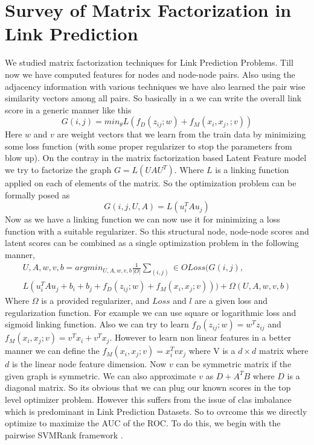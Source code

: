 \section*{Survey of Matrix Factorization in Link Prediction}
We studied matrix factorization techniques for Link Prediction Problems. Till now we have computed features for nodes and node-node pairs. Also using the adjacency information with various techniques we have also learned the pair wise similarity vectors among all pairs. So basically in a we can write the overall link score in a generic manner like this
\begin{equation}
	G(i,j) = min_{\theta} L (f_{D}(z_{ij};w) + f_{M}(x_i,x_j,;v))
\end{equation}
Here $w$ and $v$ are weight vectors that we learn from the train data by minimizing some loss function (with some proper regularizer to stop the parameters from blow up).  On the contray in the matrix factorization based Latent Feature model we try to factorize the graph $G = L ( U A U^{T})$. Where $L$ is a linking function applied on each of elements of the matrix. So the optimization problem can be formally posed as
\begin{equation}
	G(i,j,U,A) =  L (u_{i}^{T} A u_{j})
\end{equation}
Now as we have a linking function we can now use it for minimizing a loss function with a suitable regularizer. So this structural node, node-node scores and latent scores can be combined as a single optimization problem in the following manner,
\begin{multline}
\label{eq:1}
	U,A,w,v,b = argmin_{U,A,w,v,b} \frac{1}{|O|}  \sum_{(i,j)}\in O  Loss( G(i,j), \\
	 L(u_i^T A u_j + b_i + b_j + f_D(z_{ij};w) + f_M(x_i,x_j;v))) + \Omega(U,A,w,v,b)
\end{multline}
Where $\Omega$ is a provided regularizer, and $Loss$ and $l$ are a given loss and regularization function. For example we can use square or logarithmic loss and sigmoid linking function. Also we can try to learn $f_D(z_{ij};w) = w^T z_{ij}$ and $f_M(x_i,x_j;v) = v^T x_i + v^T x_j$. However to learn non linear features in a better manner we can define the  $f_M(x_i,x_j;v) =  x_i^T v x_j$ where  V is a $d \times d$ matrix where $d$ is the linear node feature dimension. Now $v$ can be symmetric matrix if the given graph is symmetric. We can also approximate $v$ as $D + A^TB$ where $D$ is a diagonal matrix. So its obvious that we can plug our known scores in the top level optimizer problem. However this suffers from the issue of clas imbalance which is predominant in Link Prediction Datasets. So to ovrcome this we directly optimize to maximize the AUC of the ROC.  To do this, we begin with the pairwise SVMRank framework .
